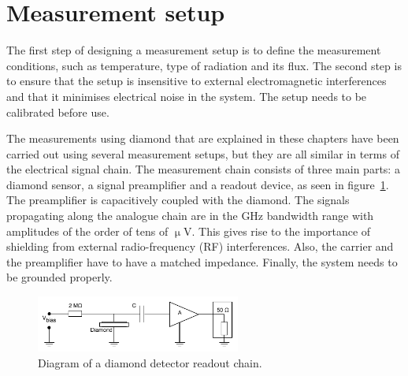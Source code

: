 \section{Measurement setup}
\label{sec:meassetup}
The first step of designing a measurement setup is to define the measurement conditions, such as temperature, type of radiation and its flux. The second step is to ensure that the setup is insensitive to external electromagnetic interferences and that it minimises electrical noise in the system. The setup needs to be calibrated before use. 


The measurements using diamond that are explained in these chapters have been carried out using several measurement setups, but they are all similar in terms of the electrical signal chain. The measurement chain consists of three main parts: a diamond sensor, a signal preamplifier and a readout device, as seen in figure~\ref{fig:ro-chain}. The preamplifier is capacitively coupled with the diamond. The signals propagating along the analogue chain are in the GHz bandwidth range with amplitudes of the order of tens of $\upmu$V. This gives rise to the importance of shielding from external radio-frequency (RF) interferences. Also, the carrier and the preamplifier have to have a matched impedance. Finally, the system needs to be grounded properly.

\begin{figure}
\centering
\includegraphics[width=0.6\textwidth]{03_measurement_results/plots/ro-chain}
\caption{Diagram of a diamond detector readout chain.}
\label{fig:ro-chain}
\end{figure}


